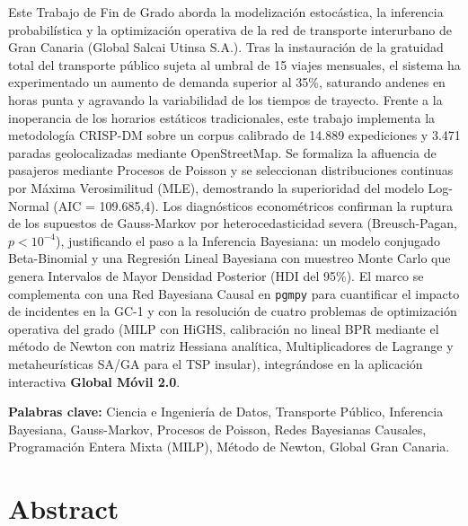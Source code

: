 \documentclass[11pt,a4paper,twoside]{report}
\begin{document}
Este Trabajo de Fin de Grado aborda la modelización estocástica, la inferencia probabilística y la optimización operativa de la red de transporte interurbano de Gran Canaria (Global Salcai Utinsa S.A.). Tras la instauración de la gratuidad total del transporte público sujeta al umbral de 15 viajes mensuales, el sistema ha experimentado un aumento de demanda superior al 35\%, saturando andenes en horas punta y agravando la variabilidad de los tiempos de trayecto. Frente a la inoperancia de los horarios estáticos tradicionales, este trabajo implementa la metodología CRISP-DM sobre un corpus calibrado de 14.889 expediciones y 3.471 paradas geolocalizadas mediante OpenStreetMap. Se formaliza la afluencia de pasajeros mediante Procesos de Poisson y se seleccionan distribuciones continuas por Máxima Verosimilitud (MLE), demostrando la superioridad del modelo Log-Normal (AIC = 109.685,4). Los diagnósticos econométricos confirman la ruptura de los supuestos de Gauss-Markov por heterocedasticidad severa (Breusch-Pagan, $p < 10^{-4}$), justificando el paso a la Inferencia Bayesiana: un modelo conjugado Beta-Binomial y una Regresión Lineal Bayesiana con muestreo Monte Carlo que genera Intervalos de Mayor Densidad Posterior (HDI del 95\%). El marco se complementa con una Red Bayesiana Causal en \texttt{pgmpy} para cuantificar el impacto de incidentes en la GC-1 y con la resolución de cuatro problemas de optimización operativa del grado (MILP con HiGHS, calibración no lineal BPR mediante el método de Newton con matriz Hessiana analítica, Multiplicadores de Lagrange y metaheurísticas SA/GA para el TSP insular), integrándose en la aplicación interactiva \textbf{Global Móvil 2.0}.

\vspace{0.8cm}
\noindent\textbf{Palabras clave:} Ciencia e Ingeniería de Datos, Transporte Público, Inferencia Bayesiana, Gauss-Markov, Procesos de Poisson, Redes Bayesianas Causales, Programación Entera Mixta (MILP), Método de Newton, Global Gran Canaria.

\chapter*{Abstract}
\end{document}
